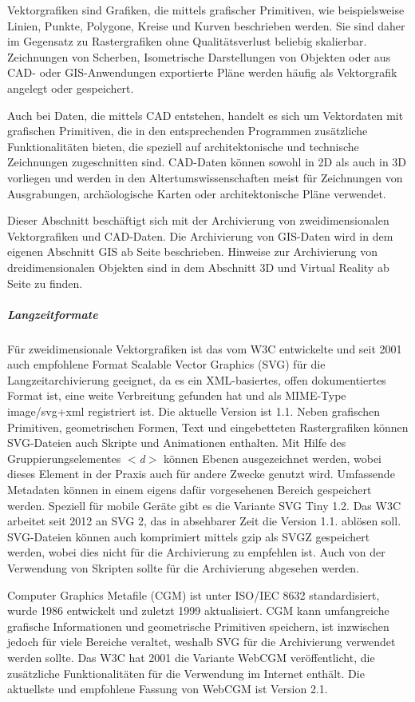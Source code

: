 Vektorgrafiken sind Grafiken, die mittels grafischer Primitiven, wie beispielsweise Linien, Punkte, Polygone, Kreise und Kurven beschrieben werden. Sie sind daher im Gegensatz zu Rastergrafiken ohne Qualitätsverlust beliebig skalierbar. Zeichnungen von Scherben, Isometrische Darstellungen von Objekten oder aus CAD- oder GIS-Anwendungen exportierte Pläne werden häufig als Vektorgrafik angelegt oder gespeichert. 

Auch bei Daten, die mittels CAD entstehen, handelt es sich um Vektordaten mit grafischen Primitiven, die in den entsprechenden Programmen zusätzliche Funktionalitäten bieten, die speziell auf architektonische und technische Zeichnungen zugeschnitten sind. CAD-Daten können sowohl in 2D als auch in 3D vorliegen und werden in den Altertumswissenschaften meist für Zeichnungen von Ausgrabungen, archäologische Karten oder architektonische Pläne verwendet.

Dieser Abschnitt beschäftigt sich mit der Archivierung von zweidimensionalen Vektorgrafiken und CAD-Daten. Die Archivierung von GIS-Daten wird in dem eigenen Abschnitt GIS ab Seite \pageref{GIS} beschrieben. Hinweise zur Archivierung von dreidimensionalen Objekten sind in dem Abschnitt 3D und Virtual Reality ab Seite \pageref{3D} zu finden.


\subparagraph{Langzeitformate}
Für zweidimensionale Vektorgrafiken ist das vom W3C entwickelte und seit 2001 auch empfohlene Format Scalable Vector Graphics (SVG) für die Langzeitarchivierung geeignet, da es ein XML-basiertes, offen dokumentiertes Format ist, eine weite Verbreitung gefunden hat und als MIME-Type image/svg+xml registriert ist. Die aktuelle Version ist 1.1. Neben grafischen Primitiven, geometrischen Formen, Text und eingebetteten Rastergrafiken können SVG-Dateien auch Skripte und Animationen enthalten. Mit Hilfe des Gruppierungselementes \emph{$<$d$>$} können Ebenen ausgezeichnet werden, wobei dieses Element in der Praxis auch für andere Zwecke genutzt wird. Umfassende Metadaten können in einem eigens dafür vorgesehenen Bereich gespeichert werden. Speziell für mobile Geräte gibt es die Variante SVG Tiny 1.2. Das W3C arbeitet seit 2012 an SVG 2, das in absehbarer Zeit die Version 1.1. ablösen soll. SVG-Dateien können auch komprimiert mittels gzip als SVGZ gespeichert werden, wobei dies nicht für die Archivierung zu empfehlen ist. Auch von der Verwendung von Skripten sollte für die Archivierung abgesehen werden.

Computer Graphics Metafile (CGM) ist unter ISO/IEC 8632 standardisiert, wurde 1986 entwickelt und zuletzt 1999 aktualisiert. CGM kann umfangreiche grafische Informationen und geometrische Primitiven speichern, ist inzwischen jedoch für viele Bereiche veraltet, weshalb SVG für die Archivierung verwendet werden sollte. Das W3C hat 2001 die Variante WebCGM veröffentlicht, die zusätzliche Funktionalitäten für die Verwendung im Internet enthält. Die aktuellste und empfohlene Fassung von WebCGM ist Version 2.1.

